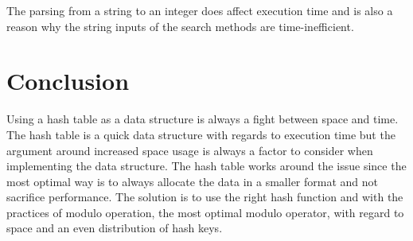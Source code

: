 \documentclass[a4paper,11pt]{article}
\begin{document}
        The parsing from a string to an integer does affect execution time and is also a reason why the string inputs of the search methods are time-inefficient.
\section*{Conclusion}

    Using a hash table as a data structure is always a fight between space and time. The hash table is a quick data structure with regards to execution time but the argument around increased space usage is always a factor to consider when implementing the data structure. The hash table works around the issue since the most optimal way is to always allocate the data in a smaller format and not sacrifice performance. The solution is to use the right hash function and with the practices of modulo operation, the most optimal modulo operator, with regard to space and an even distribution of hash keys.
    
\end{document}
